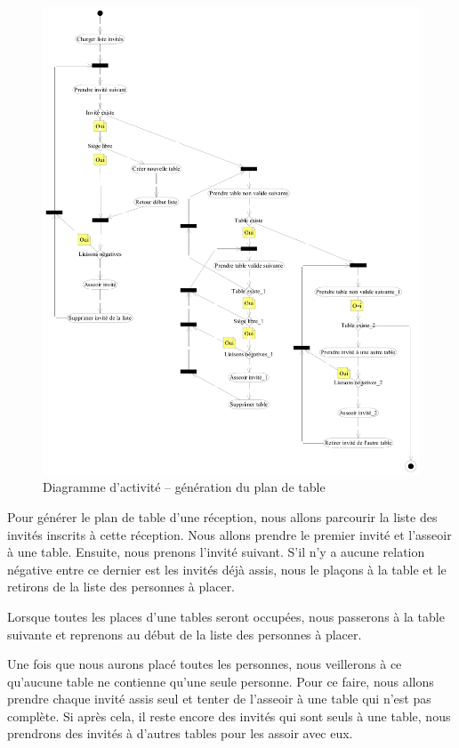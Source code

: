 \begin{figure}
  \centering
  \includegraphics[width=\textwidth]{IMG/da_plan_tables}
  \caption{Diagramme d'activité -- génération du plan de table}
  \label{img_da_plan_tables}
\end{figure}

Pour générer le plan de table d'une réception, nous allons parcourir la liste des invités inscrits à cette réception. Nous allons prendre le premier invité et l'asseoir à une table. Ensuite, nous prenons l'invité suivant. S'il n'y a aucune relation négative entre ce dernier est les invités déjà assis, nous le plaçons à la table et le retirons de la liste des personnes à placer.

Lorsque toutes les places d'une tables seront occupées, nous passerons à la table suivante et reprenons au début de la liste des personnes à placer.

Une fois que nous aurons placé toutes les personnes, nous veillerons à ce qu'aucune table ne contienne qu'une seule personne. Pour ce faire, nous allons prendre chaque invité assis seul et tenter de l'asseoir à une table qui n'est pas complète. Si après cela, il reste encore des invités qui sont seuls à une table, nous prendrons des invités à d'autres tables pour les assoir avec eux.

